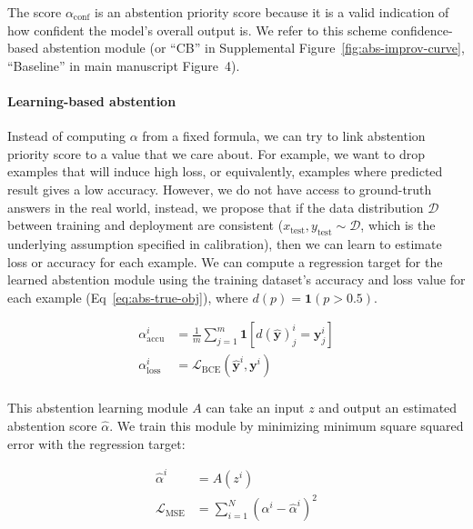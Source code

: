 \documentclass{article}[11pt,oneside]
\begin{document}
The score $\alpha_{\text{conf}}$ is an abstention priority score because it is a valid indication of how confident the model's overall output is. We refer to this scheme confidence-based abstention module (or ``CB'' in Supplemental Figure~\ref{fig:abs-improv-curve}, ``Baseline'' in main manuscript Figure~4).

\paragraph{Learning-based abstention}

Instead of computing $\alpha$ from a fixed formula, we can try to link abstention priority score to a value that we care about. For example, we want to drop examples that will induce high loss, or equivalently, examples where predicted result gives a low accuracy. However, we do not have access to ground-truth answers in the real world, instead, we propose that if the data distribution $\mathcal{D}$ between training and deployment are consistent ($x_{\text{test}}, y_{\text{test}} \sim \mathcal{D}$, which is the underlying assumption specified in calibration), then we can learn to estimate loss or accuracy for each example. 
We can compute a regression target for the learned abstention module using the training dataset's accuracy and loss value for each example (Eq~\ref{eq:abs-true-obj}), where $d(p) = \mathbf{1}(p > 0.5)$.

\begin{equation}
\begin{aligned}
\alpha_{\text{accu}}^i &= \frac{1}{m} \sum_{j=1}^m \mathbf{1}[d(\bm{\hat y})^i_j = \bm{y}^i_j] \\
\alpha_{\text{loss}}^i &= \mathcal{L}_{\text{BCE}}(\bm{\hat y}^i, \bm{y}^i) \\
\end{aligned}
\label{eq:abs-true-obj}
\end{equation}

This abstention learning module $A$ can take an input $z$ and output an estimated abstention score $\hat \alpha$. We train this module by minimizing minimum square squared error with the regression target:

\begin{equation}
\begin{aligned}
\hat \alpha^i &= A(z^i) \\ %
\mathcal{L}_{\text{MSE}} &= \sum_{i=1}^N (\alpha^i - \hat \alpha^i)^2 \\ %
\end{aligned}
\label{eq:abs-learned}
\end{equation}
\end{document}
